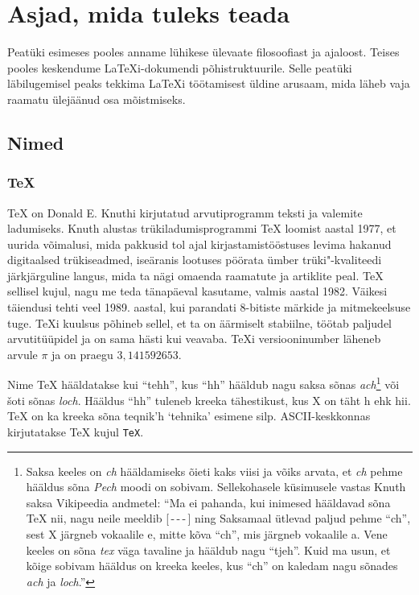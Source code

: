 
\chapter{Asjad, mida tuleks teada}
\begin{intro}
Peatüki esimeses pooles anname lühikese ülevaate \LaTeXe{} filosoofiast
ja ajaloost. Teises pooles keskendume \LaTeX i-dokumendi
põhistruktuurile. Selle peatüki läbilugemisel peaks tekkima \LaTeX i
töötamisest üldine arusaam, mida läheb vaja raamatu ülejäänud osa
mõistmiseks.
\end{intro}

\section{Nimed}
\subsection{\TeX}

\TeX{} on Donald E. Knuthi kirjutatud
arvutiprogramm \cite{texbook} teksti ja valemite ladumiseks. Knuth
alustas trükiladumisprogrammi \TeX{} loomist aastal 1977, et uurida
võimalusi, mida pakkusid tol ajal kirjastamistööstuses levima hakanud
digitaalsed trükiseadmed, iseäranis lootuses pöörata ümber
trüki"-kvaliteedi järkjärguline langus, mida ta nägi omaenda raamatute ja
artiklite peal. \TeX{} sellisel kujul, nagu me teda tänapäeval kasutame,
valmis aastal 1982. Väikesi täiendusi tehti veel 1989. aastal, kui
parandati 8-bitiste märkide ja mitmekeelsuse tuge. \TeX i kuulsus
põhineb sellel, et ta on äärmiselt stabiilne, töötab paljudel
arvutitüüpidel ja on sama hästi kui veavaba. \TeX i versiooninumber
läheneb arvule $\pi$ ja on praegu $3{,}141592653$.

Nime \TeX{} hääldatakse kui "`tehh"', kus "`hh"' hääldub nagu saksa
sõnas \emph{ach}\footnote{Saksa keeles on \emph{ch} hääldamiseks õieti
kaks viisi ja võiks arvata, et \emph{ch} pehme hääldus sõna \emph{Pech}
moodi on sobivam. Sellekohasele küsimusele vastas Knuth saksa Vikipeedia
andmetel: "`Ma ei pahanda, kui inimesed hääldavad sõna \TeX{} nii, nagu
neile meeldib [\,-\,-\,-\,] ning Saksamaal ütlevad paljud pehme "`ch"',
sest X järgneb vokaalile e, mitte kõva "`ch"', mis järgneb vokaalile a.
Vene keeles on sõna \emph{tex} väga tavaline ja hääldub nagu "`tjeh"'.
Kuid ma usun, et kõige sobivam hääldus on kreeka keeles, kus "`ch"' on
kaledam nagu sõnades \emph{ach} ja \emph{loch}."'} või \v{s}oti sõnas
\emph{loch}. Hääldus "`hh"' tuleneb kreeka tähestikust, kus X on täht h
ehk hii. \TeX{} on ka kreeka sõna {\greektext teqnik'h} `tehnika'
esimene silp. ASCII-keskkonnas kirjutatakse \TeX{} kujul \texttt{TeX}.

